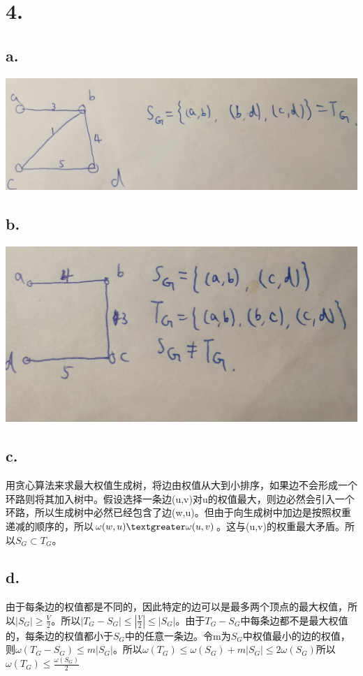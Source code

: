 \documentclass{article}
\begin{document}
	\section*{4.}
	\subsection*{a.}
	\includegraphics[scale=0.125]{1.jpg}
	\subsection*{b.}
	\includegraphics[scale=0.125]{2.jpg}
	\subsection*{c.}
	\par{用贪心算法来求最大权值生成树，将边由权值从大到小排序，如果边不会形成一个环路则将其加入树中。假设选择一条边(u,v)对u的权值最大，则边必然会引入一个环路，所以生成树中必然已经包含了边(w,u)。但由于向生成树中加边是按照权重递减的顺序的，所以$\omega(w,u)\textgreater \omega(u,v)$。这与(u,v)的权重最大矛盾。所以$S_{G}\subset T_{G}$。}
	\subsection*{d.}
	\par{由于每条边的权值都是不同的，因此特定的边可以是最多两个顶点的最大权值，所以$|S_{G}|\ge \frac{V}{2}$。所以$|T_{G}- S_{G}|\le |\frac{V}{2}|\le |S_{G}|$。由于$T_{G}-S_{G}$中每条边都不是最大权值的，每条边的权值都小于$S_{G}$中的任意一条边。令m为$S_{G}$中权值最小的边的权值，则$\omega(T_{G}-S_{G})\le m|S_{G}|$。所以$\omega(T_{G})\le \omega(S_{G})+m|S_{G}|\le 2\omega(S_{G})$所以$\omega(T_{G})\le \frac{\omega(S_{G})}{2}$}
\end{document}
